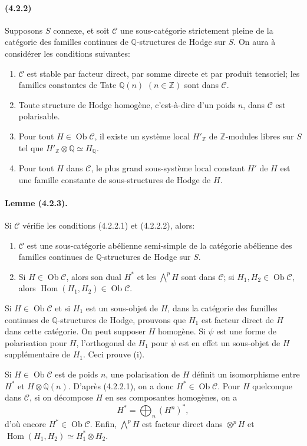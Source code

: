 \documentclass[10pt]{article}
\newcommand{\Q}{\mathbb Q}
\newcommand{\Z}{\mathbb Z}
\newcommand{\Hom}{\operatorname{Hom}}
\newcommand{\Ob}{\operatorname{Ob}}
\begin{document}
\paragraph{(4.2.2)} Supposons $S$ connexe, et soit $\mathcal C$ une sous-catégorie strictement pleine de la catégorie des familles continues de $\Q$-structures de Hodge sur $S$. On aura à considérer les conditions suivantes:
\begin{enumerate}[label=(4.2.2.\arabic*)]
\item $\mathcal C$ est stable par facteur direct, par somme directe et par produit tensoriel; les familles constantes de Tate $\Q(n)$ $(n\in\Z)$ sont dans $\mathcal C$.
\item Toute structure de Hodge homogène, c'est-à-dire d'un poids $n$, dans $\mathcal C$ est polarisable.
\item Pour tout $H\in\Ob\mathcal C$, il existe un système local $H'_\Z$ de $\Z$-modules libres sur $S$ tel que $H'_\Z\otimes\Q\simeq H_\Q$.
\item Pour tout $H$ dans $\mathcal C$, le plus grand sous-système local constant $H'$ de $H$ est une famille constante de sous-structures de Hodge de $H$.
\end{enumerate}

\paragraph{Lemme (4.2.3).} Si $\mathcal C$ vérifie les conditions (4.2.2.1) et (4.2.2.2), alors:
\begin{enumerate}[label=(\roman*)]
\item $\mathcal C$ est une sous-catégorie abélienne semi-simple de la catégorie abélienne des familles continues de $\Q$-structures de Hodge sur $S$.
\item Si $H\in\Ob\mathcal C$, alors son dual $H^*$ et les $\bigwedge^pH$ sont dans $\mathcal C$; si $H_1,H_2\in\Ob\mathcal C$, alors $\Hom(H_1,H_2)\in\Ob\mathcal C$.
\end{enumerate}

Si $H\in\Ob\mathcal C$ et si $H_1$ est un sous-objet de $H$, dans la catégorie des familles continues de $\Q$-structures de Hodge, prouvons que $H_1$ est facteur direct de $H$ dans cette catégorie. On peut supposer $H$ homogène. Si $\psi$ est une forme de polarisation pour $H$, l'orthogonal de $H_1$ pour $\psi$ est en effet un sous-objet de $H$ supplémentaire de $H_1$. Ceci prouve (i).

Si $H\in\Ob\mathcal C$ est de poids $n$, une polarisation de $H$ définit un isomorphisme entre $H^*$ et $H\otimes\Q(n)$. D'après (4.2.2.1), on a donc $H^*\in\Ob\mathcal C$. Pour $H$ quelconque dans $\mathcal C$, si on décompose $H$ en ses composantes homogènes, on a
\[
H^*=\bigoplus_n (H^n)^*,
\]
d'où encore $H^*\in\Ob\mathcal C$. Enfin, $\bigwedge^pH$ est facteur direct dans $\otimes^pH$ et $\Hom(H_1,H_2)\simeq H_1^*\otimes H_2$.
\end{document}
